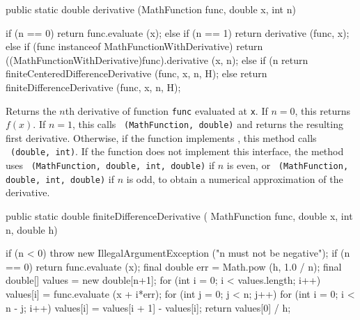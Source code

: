 \begin{htmlonly}
\end{htmlonly}
\begin{code}

   public static double derivative (MathFunction func, double x, int n)\begin{hide} {
      if (n == 0)
         return func.evaluate (x);
      else if (n == 1)
         return derivative (func, x);
      else if (func instanceof MathFunctionWithDerivative)
         return ((MathFunctionWithDerivative)func).derivative (x, n);
      else if (n %
         return finiteCenteredDifferenceDerivative (func, x, n, H);
      else
         return finiteDifferenceDerivative (func, x, n, H);
   }\end{hide}
\end{code}
\begin{tabb}   Returns the $n$th derivative of function
 \texttt{func} evaluated at \texttt{x}.
 If $n=0$, this returns $f(x)$.
 If $n=1$, this calls
 ~\texttt{(MathFunction, double)}
 and returns the resulting first derivative.
 Otherwise,
 if the function implements
 ,
 this method calls
~\texttt{(double, int)}.
 If the function does not implement this
 interface,
 the method uses
 ~\texttt{(MathFunction, double, int, double)}
 if $n$ is even, or
 ~\texttt{(MathFunction, double, int, double)}
 if $n$ is odd,
 to obtain a numerical approximation of the derivative.
\end{tabb}
\begin{htmlonly}
\end{htmlonly}
\begin{code}

   public static double finiteDifferenceDerivative (
                 MathFunction func, double x, int n, double h)\begin{hide} {
      if (n < 0)
         throw new IllegalArgumentException
         ("n must not be negative");
      if (n == 0)
         return func.evaluate (x);
      final double err = Math.pow (h, 1.0 / n);
      final double[] values = new double[n+1];
      for (int i = 0; i < values.length; i++)
         values[i] = func.evaluate (x + i*err);
      for (int j = 0; j < n; j++) {
         for (int i = 0; i < n - j; i++)
            values[i] = values[i + 1] - values[i];
      }
      return values[0] / h;
   }\end{hide}
\end{code}
